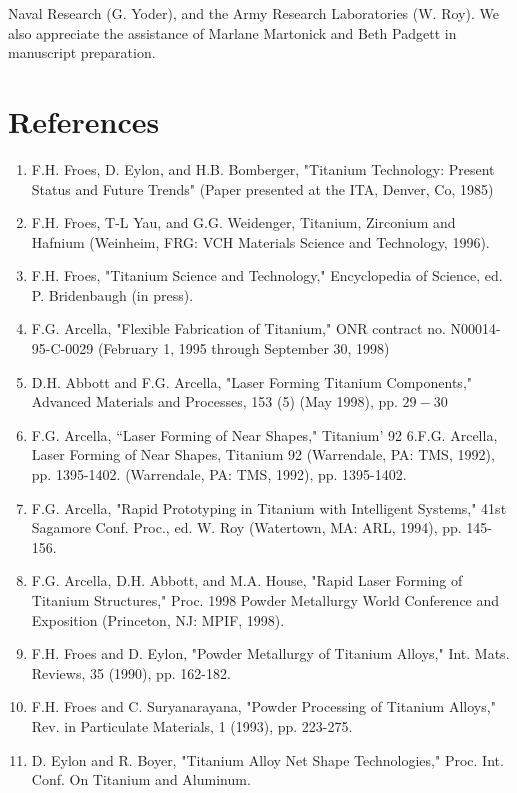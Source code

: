 \documentclass[10pt]{article}
\begin{document}
Naval Research (G. Yoder), and the Army Research Laboratories (W. Roy). We also appreciate the assistance of Marlane Martonick and Beth Padgett in manuscript preparation.

\section*{References}
\begin{enumerate}
  \item F.H. Froes, D. Eylon, and H.B. Bomberger, "Titanium Technology: Present Status and Future Trends" (Paper presented at the ITA, Denver, Co, 1985)

  \item F.H. Froes, T-L Yau, and G.G. Weidenger, Titanium, Zirconium and Hafnium (Weinheim, FRG: VCH Materials Science and Technology, 1996).

  \item F.H. Froes, "Titanium Science and Technology," Encyclopedia of Science, ed. P. Bridenbaugh (in press).

  \item F.G. Arcella, "Flexible Fabrication of Titanium," ONR contract no. N00014-95-C-0029 (February 1, 1995 through September 30, 1998)

  \item D.H. Abbott and F.G. Arcella, "Laser Forming Titanium Components," Advanced Materials and Processes, 153 (5) (May 1998), pp. $29-30$

  \item F.G. Arcella, “Laser Forming of Near Shapes," Titanium' 92 6.F.G. Arcella, Laser Forming of Near Shapes, Titanium 92 (Warrendale, PA: TMS, 1992), pp. 1395-1402. (Warrendale, PA: TMS, 1992), pp. 1395-1402.

  \item F.G. Arcella, "Rapid Prototyping in Titanium with Intelligent Systems," 41st Sagamore Conf. Proc., ed. W. Roy (Watertown, MA: ARL, 1994), pp. 145-156.

  \item F.G. Arcella, D.H. Abbott, and M.A. House, "Rapid Laser Forming of Titanium Structures," Proc. 1998 Powder Metallurgy World Conference and Exposition (Princeton, NJ: MPIF, 1998).

  \item F.H. Froes and D. Eylon, "Powder Metallurgy of Titanium Alloys," Int. Mats. Reviews, 35 (1990), pp. 162-182.

  \item F.H. Froes and C. Suryanarayana, "Powder Processing of Titanium Alloys," Rev. in Particulate Materials, 1 (1993), pp. 223-275.

  \item D. Eylon and R. Boyer, "Titanium Alloy Net Shape Technologies," Proc. Int. Conf. On Titanium and Aluminum.

\end{enumerate}
\end{document}
